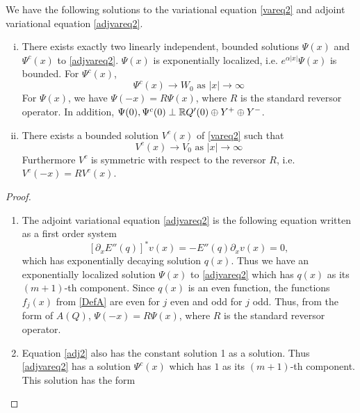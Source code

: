 \documentclass[thesis.tex]{subfiles}
\begin{document}
\begin{lemma}\label{varadjsolutions}
We have the following solutions to the variational equation \eqref{vareq2} and adjoint variational equation \eqref{adjvareq2}.

\begin{enumerate}[(i)]

\item There exists exactly two linearly independent, bounded solutions $\Psi(x)$ and $\Psi^c(x)$ to \eqref{adjvareq2}. $\Psi(x)$ is exponentially localized, i.e. $e^{\alpha |x|}\Psi(x)$ is bounded. For $\Psi^c(x)$,
	\begin{equation}
	\Psi^c(x) \rightarrow W_0 \text{ as }|x| \rightarrow \infty
	\end{equation}
For $\Psi(x)$, we have $\Psi(-x) = R \Psi(x)$, where $R$ is the standard reversor operator. In addition, $\Psi(0), \Psi^c(0) \perp {\mathbb R} Q'(0) \oplus Y^+ \oplus Y^-$.

\item There exists a bounded solution $V^c(x)$ of \eqref{vareq2} such that 
\begin{equation}
V^c(x) \rightarrow V_0 \text{ as }|x| \rightarrow \infty
\end{equation}
Furthermore $V^c$ is symmetric with respect to the reversor $R$, i.e. $V^c(-x) = R V^c(x)$.
\end{enumerate}

\begin{proof}

\begin{enumerate}
\item The adjoint variational equation \eqref{adjvareq2} is the following equation written as a first order system
\begin{equation}\label{adj2}
[\partial_x E''(q) ]^* v(x) = -E''(q) \partial_x v(x) = 0,
\end{equation}
which has exponentially decaying solution $q(x)$. Thus we have an exponentially localized solution $\Psi(x)$ to \eqref{adjvareq2} which has $q(x)$ as its $(m+1)$-th component. Since $q(x)$ is an even function, the functions $f_j(x)$ from \eqref{DefA} are even for $j$ even and odd for $j$ odd. Thus, from the form of $A(Q)$, $\Psi(-x) = R \Psi(x)$, where $R$ is the standard reversor operator.

\item Equation \eqref{adj2} also has the constant solution 1 as a solution. Thus \eqref{adjvareq2} has a solution $\Psi^c(x)$ which has $1$ as its $(m+1)$-th component. This solution has the form


\end{enumerate}
\end{proof}
\end{lemma}
\end{document}
